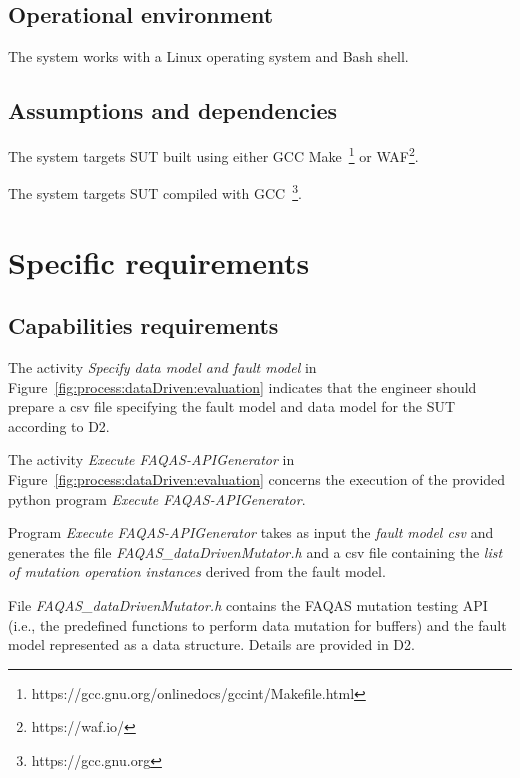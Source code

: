 \subsection{Operational environment}

\RQ{} The system works with a Linux operating system and Bash shell.

\subsection{Assumptions and dependencies}

\RQ{} The system targets SUT built using either GCC Make~\footnote{https://gcc.gnu.org/onlinedocs/gccint/Makefile.html} or WAF\footnote{https://waf.io/}.

\RQ{} The system targets SUT compiled with GCC~\footnote{https://gcc.gnu.org}.

\section{Specific requirements}
\subsection{Capabilities requirements}
\label{sec:data:rquirements:capabilities}

\RQ The activity \emph{Specify data model and fault model} in Figure~\ref{fig:process:dataDriven:evaluation} indicates that the engineer should prepare a csv file specifying the fault model and data model for the SUT according to D2.

\RQ{} The activity \emph{Execute FAQAS-APIGenerator} in Figure~\ref{fig:process:dataDriven:evaluation} concerns the execution of the provided python program \emph{Execute FAQAS-APIGenerator}.

\RQ{} Program \emph{Execute FAQAS-APIGenerator} takes as input the \emph{fault model csv} and generates the file \emph{FAQAS\_dataDrivenMutator.h} and a csv file containing the \emph{list of mutation operation instances} derived from the fault model.

\RQ{} File \emph{FAQAS\_dataDrivenMutator.h} contains the FAQAS mutation testing API (i.e., the predefined functions to perform data mutation for buffers) and the fault model represented as a data structure. Details are provided in D2.

